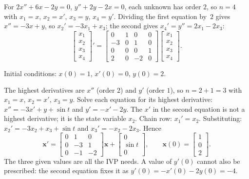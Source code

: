 \documentclass[10pt]{scrartcl}
\newcommand{\vv}[1]{\mathbf{#1}}
\begin{document}
\begin{example*}
  For $2x''+6x-2y=0$, $y''+2y-2x=0$, each unknown has order $2$, so $n=4$ with $x_1=x$, $x_2=x'$, $x_3=y$, $x_4=y'$. Dividing the first equation by~$2$ gives $x''=-3x+y$, so $x_2'=-3x_1+x_3$; the second gives $x_4'=y''=2x_1-2x_3$:
  \[
    \begin{bmatrix}x_1\\x_2\\x_3\\x_4\end{bmatrix}' =
    \begin{bmatrix}0&1&0&0\\-3&0&1&0\\0&0&0&1\\2&0&-2&0\end{bmatrix}
    \begin{bmatrix}x_1\\x_2\\x_3\\x_4\end{bmatrix}.
  \]
\end{example*}

\begin{example*}[Mixed orders: $x''+3x'-y=\sin t$, $y'+x'+2y=0$]
  Initial conditions: $x(0)=1$, $x'(0)=0$, $y(0)=2$.
  \begin{steps}
    \ii The highest derivatives are $x''$ (order $2$) and $y'$ (order $1$), so $n=2+1=3$ with $x_1=x$, $x_2=x'$, $x_3=y$.
    \ii Solve each equation for its highest derivative: $x''=-3x'+y+\sin t$ and $y'=-x'-2y$. The $x'$ in the second equation is not a highest derivative; it is the state variable $x_2$.
    \ii Chain row: $x_1'=x_2$. Substituting: $x_2'=-3x_2+x_3+\sin t$ and $x_3'=-x_2-2x_3$. Hence
    \[
      \vv x'=\begin{bmatrix}0&1&0\\0&-3&1\\0&-1&-2\end{bmatrix}\vv x+\begin{bmatrix}0\\\sin t\\0\end{bmatrix},\qquad \vv x(0)=\begin{bmatrix}1\\0\\2\end{bmatrix}.
    \]
    \ii The three given values are all the IVP needs. A value of $y'(0)$ cannot also be prescribed: the second equation fixes it as $y'(0)=-x'(0)-2y(0)=-4$.
  \end{steps}
\end{example*}
\end{document}
